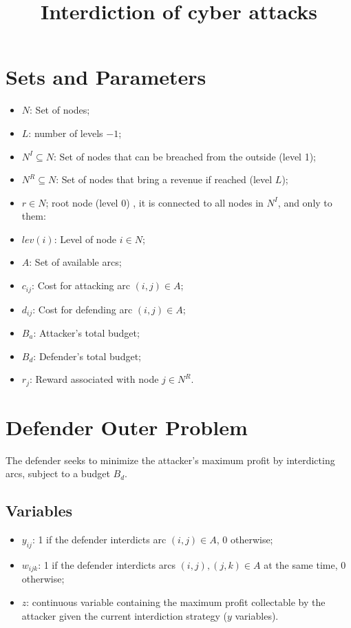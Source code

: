 \documentclass{article}
\begin{document}
\title{Interdiction of cyber attacks}
\maketitle
\section{Sets and Parameters}
\begin{itemize}
    \item $N$: Set of nodes;
    \item $L$: number of levels $- 1$;
    \item $N^I \subseteq N$: Set of nodes that can be breached from the outside (level 1);
    \item $N^R \subseteq N$: Set of nodes that bring a revenue if reached (level $L$);
    \item $r \in N$; root node (level 0) , it is connected to all nodes in $N^I$, and only to them:
    \item $lev(i)$: Level of node $i \in N$;
    \item $A$: Set of available arcs;
    \item $c_{ij}$: Cost for attacking arc $(i, j) \in A$;
    \item $d_{ij}$: Cost for defending arc $(i, j) \in A$;
    \item $B_a$: Attacker's total budget;
    \item $B_d$: Defender's total budget;
    \item $r_j$: Reward associated with node $j \in N^R$.
\end{itemize}


\section{Defender Outer Problem}
The defender seeks to minimize the attacker's maximum profit by interdicting arcs, subject to a budget $B_{d}$.

\subsection{Variables}
\begin{itemize}
    \item $y_{ij}$: 1 if the defender interdicts arc $(i,j) \in A$, 0 otherwise;
    \item $w_{ijk}$: 1 if the defender interdicts arcs $(i,j), (j,k) \in A$ at the same time, 0 otherwise;
    \item $z$: continuous variable containing the maximum profit collectable by the attacker given the current interdiction strategy ($y$ variables).
\end{itemize}
\end{document}
